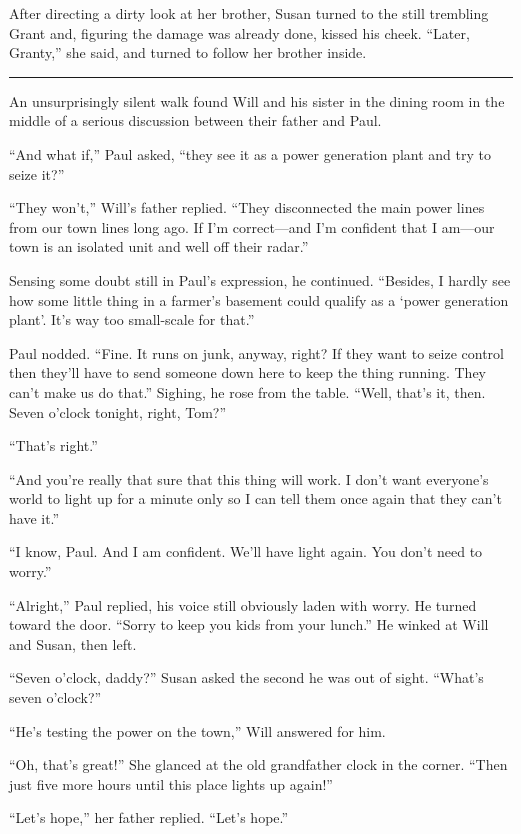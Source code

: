 \documentclass[12pt,letterpaper,oneside,english]{book}
\begin{document}
After directing a dirty look at her brother, Susan turned to the still
trembling Grant and, figuring the damage was already done, kissed his
cheek. ``Later, Granty,'' she said, and turned to follow her brother
inside.

\medskip
{\centering\rule{\linewidth}{1pt}}
\smallskip

An unsurprisingly silent walk found Will and his sister in the dining room
in the middle of a serious discussion between their father and Paul.

``And what if,'' Paul asked, ``they see it as a power generation plant and
try to seize it?''

``They won't,'' Will's father replied. ``They disconnected the main
power lines from our town lines long ago. If I'm correct---and I'm
confident that I am---our town is an isolated unit and well off their
radar.''

Sensing some doubt still in Paul's expression, he continued. ``Besides, I
hardly see how some little thing in a farmer's basement could qualify as a
`power generation plant'. It's way too small-scale for that.''

Paul nodded. ``Fine. It runs on junk, anyway, right? If they want to seize
control then they'll have to send someone down here to keep the thing
running. They can't make us do that.'' Sighing, he rose from the table.
``Well, that's it, then. Seven o'clock tonight, right, Tom?''

``That's right.''

``And you're really that sure that this thing will work. I don't want
everyone's world to light up for a minute only so I can tell them once
again that they can't have it.''

``I know, Paul. And I am confident. We'll have light again. You don't need
to worry.''

``Alright,'' Paul replied, his voice still obviously laden with worry.
He turned toward the door. ``Sorry to keep you kids from your lunch.''
He winked at Will and Susan, then left.

``Seven o'clock, daddy?'' Susan asked the second he was out of sight.
``What's seven o'clock?''

``He's testing the power on the town,'' Will answered for him.

``Oh, that's great!'' She glanced at the old grandfather clock in the
corner. ``Then just five more hours until this place lights up again!''

``Let's hope,'' her father replied. ``Let's hope.''
\end{document}
